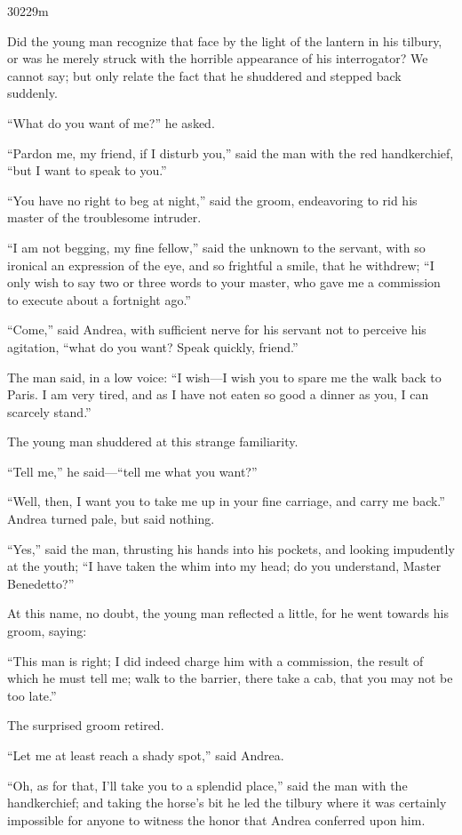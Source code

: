 30229m



Did the young man recognize that face by the light of the lantern in
his tilbury, or was he merely struck with the horrible appearance of
his interrogator? We cannot say; but only relate the fact that he
shuddered and stepped back suddenly.

“What do you want of me?” he asked.

“Pardon me, my friend, if I disturb you,” said the man with the red
handkerchief, “but I want to speak to you.”

“You have no right to beg at night,” said the groom, endeavoring to rid
his master of the troublesome intruder.

“I am not begging, my fine fellow,” said the unknown to the servant,
with so ironical an expression of the eye, and so frightful a smile,
that he withdrew; “I only wish to say two or three words to your
master, who gave me a commission to execute about a fortnight ago.”

“Come,” said Andrea, with sufficient nerve for his servant not to
perceive his agitation, “what do you want? Speak quickly, friend.”

The man said, in a low voice: “I wish—I wish you to spare me the walk
back to Paris. I am very tired, and as I have not eaten so good a
dinner as you, I can scarcely stand.”

The young man shuddered at this strange familiarity.

“Tell me,” he said—“tell me what you want?”

“Well, then, I want you to take me up in your fine carriage, and carry
me back.” Andrea turned pale, but said nothing.

“Yes,” said the man, thrusting his hands into his pockets, and looking
impudently at the youth; “I have taken the whim into my head; do you
understand, Master Benedetto?”

At this name, no doubt, the young man reflected a little, for he went
towards his groom, saying:

“This man is right; I did indeed charge him with a commission, the
result of which he must tell me; walk to the barrier, there take a cab,
that you may not be too late.”

The surprised groom retired.

“Let me at least reach a shady spot,” said Andrea.

“Oh, as for that, I’ll take you to a splendid place,” said the man with
the handkerchief; and taking the horse’s bit he led the tilbury where
it was certainly impossible for anyone to witness the honor that Andrea
conferred upon him.

